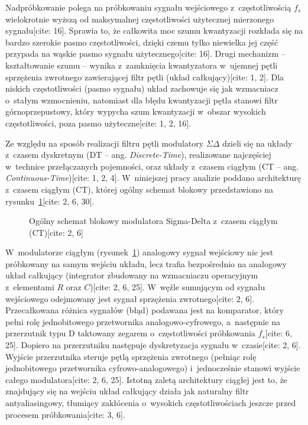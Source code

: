 Nadpróbkowanie polega na próbkowaniu sygnału wejściowego z~częstotliwością $f_s$ wielokrotnie wyższą od maksymalnej częstotliwości użytecznej mierzonego sygnału[cite: 16]. Sprawia to, że całkowita moc szumu kwantyzacji rozkłada się na bardzo szerokie pasmo częstotliwości, dzięki czemu tylko niewielka jej część przypada na wąskie pasmo sygnału użytecznego[cite: 16]. Drugi mechanizm -- kształtowanie szumu -- wynika z~zamknięcia kwantyzatora w~ujemnej pętli sprzężenia zwrotnego zawierającej filtr pętli (układ całkujący)[cite: 1, 2]. Dla niskich częstotliwości (pasmo sygnału) układ zachowuje się jak wzmacniacz o~stałym wzmocnieniu, natomiast dla błędu kwantyzacji pętla stanowi filtr górnoprzepustowy, który wypycha szum kwantyzacji w~obszar wysokich częstotliwości, poza pasmo użyteczne[cite: 1, 2, 16].

Ze względu na sposób realizacji filtru pętli modulatory $\Sigma\Delta$ dzieli się na układy z~czasem dyskretnym (DT -- ang. \textit{Discrete-Time}), realizowane najczęściej w~technice przełączanych pojemności, oraz układy z~czasem ciągłym (CT -- ang. \textit{Continuous-Time})[cite: 1, 2, 4]. W~niniejszej pracy analizie poddano architekturę z~czasem ciągłym (CT), której ogólny schemat blokowy przedstawiono na rysunku~\ref{rys:ct_sdm_ogolny}[cite: 2, 6, 30].

\begin{figure}[!htbp]
	\centering
	\caption{Ogólny schemat blokowy modulatora Sigma-Delta z~czasem ciągłym (CT)[cite: 2, 6]}
	\label{rys:ct_sdm_ogolny}
\end{figure}

W~modulatorze ciągłym (rysunek~\ref{rys:ct_sdm_ogolny}) analogowy sygnał wejściowy nie jest próbkowany na samym wejściu układu, lecz trafia bezpośrednio na analogowy układ całkujący (integrator zbudowany na wzmacniaczu operacyjnym z~elementami $R$ oraz $C$)[cite: 2, 6, 25]. W~węźle sumującym od sygnału wejściowego odejmowany jest sygnał sprzężenia zwrotnego[cite: 2, 6]. Przecałkowana różnica sygnałów (błąd) podawana jest na komparator, który pełni rolę jednobitowego przetwornika analogowo-cyfrowego, a~następnie na przerzutnik typu D taktowany zegarem o~częstotliwości próbkowania $f_s$[cite: 6, 25]. Dopiero na przerzutniku następuje dyskretyzacja sygnału w~czasie[cite: 2, 6]. Wyjście przerzutnika steruje pętlą sprzężenia zwrotnego (pełniąc rolę jednobitowego przetwornika cyfrowo-analogowego) i~jednocześnie stanowi wyjście całego modulatora[cite: 2, 6, 25]. Istotną zaletą architektury ciągłej jest to, że znajdujący się na wejściu układ całkujący działa jak naturalny filtr antyaliasingowy, tłumiący zakłócenia o~wysokich częstotliwościach jeszcze przed procesem próbkowania[cite: 3, 6].


